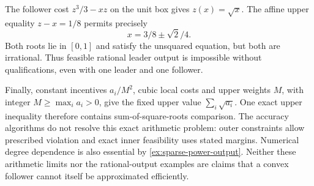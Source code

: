 \begin{example}
\label{ex:accuracy-irrational-feasibility}
The follower cost $z^3/3-xz$ on the unit box gives $z(x)=\sqrt x$.
The affine upper equality $z-x=1/8$ permits precisely
\[
                         x=3/8\pm\sqrt2/4.
\]
Both roots lie in $[0,1]$ and satisfy the unsquared equation, but both
are irrational. Thus feasible rational leader output is impossible
without qualifications, even with one leader and one follower.
\end{example}

Finally, constant incentives $a_i/M^2$, cubic local costs and upper
weights $M$, with integer $M\ge\max_i a_i>0$, give the fixed upper
value $\sum_i\sqrt{a_i}$. One exact upper inequality therefore
contains sum-of-square-roots comparison. The accuracy algorithms do not
resolve this exact arithmetic problem: outer constraints allow prescribed
violation and exact inner feasibility uses stated margins. Numerical
degree dependence is also essential by \cref{ex:sparse-power-output}.
Neither these arithmetic limits nor the rational-output examples are
claims that a convex follower cannot itself be approximated efficiently.
